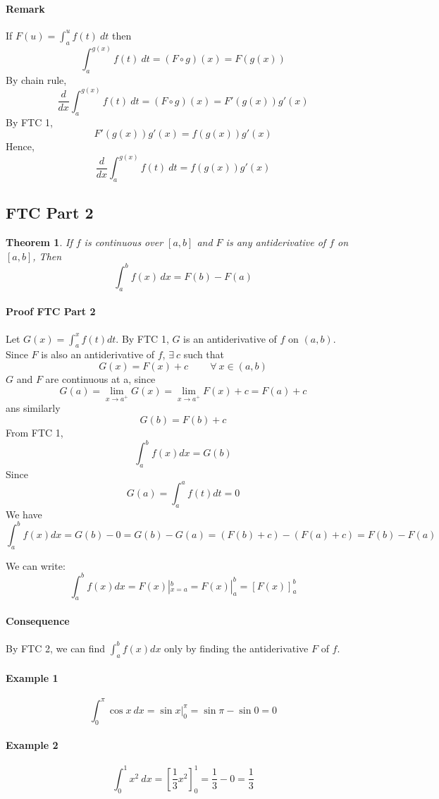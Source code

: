 \documentclass[12pt]{article}
\newtheorem{theorem}{Theorem}
\begin{document}
\paragraph{Remark} If $F(u) = \int_a^u f(t)\:  dt$ then
\[
    \int_a^{g(x)} f(t)\: dt = (F \circ g)(x) = F(g(x))
\]
By chain rule,
\[
    \frac{d}{dx} \int_a^{g(x)} f(t)\: dt = (F \circ g)(x) = F'(g(x))g'(x) 
\]
By FTC 1,
\[
    F'(g(x))g'(x)  = f(g(x))g'(x) 
\]
Hence,
\[
    \frac{d}{dx} \int_a^{g(x)} f(t)\: dt = f(g(x))g'(x) 
\]
\subsection{FTC Part 2}
\begin{theorem} 
    If $f$ is continuous over $[a, b]$ and $F$ is any antiderivative of $f$ on $[a, b]$, Then
    \[
        \int_a^b f(x) \, dx = F(b) - F(a)
    \]
\end{theorem}
\paragraph{Proof FTC Part 2}
Let $G(x) = \int_a^x f(t) dt$. By FTC 1, $G$ is an antiderivative of $f$ on $(a, b)$. Since $F$ is also an antiderivative of $f$, 
$\exists \: c$ such that 
\[
    G(x) = F(x) + c\qquad\: \forall \: x \in (a, b)
\]
$G$ and $F$ are continuous at a, since
\[
    G(a) = \lim_{x \to a^{ +}} G(x) = \lim_{x \to a^{ +}} F(x) + c = F(a) + c
\]
ans similarly
\[
    G(b) = F(b) + c
\]
From FTC 1, 
\[
    \int_a^b f(x) dx = G(b)
\]
Since
\[
    G(a) = \int_a^a f(t) dt = 0
\]
We have
\[
    \int_a^b f(x) dx = G(b) - 0 = G(b) - G(a) = (F(b) + c)- (F(a) + c) = F(b) - F(a)
\]

We can write:
\[
    \int_a^b f(x) dx = F(x) |^{b}_{x = a} = F(x) |^{b}_{a} = [F(x)]^{b}_a
\]

\paragraph{Consequence} By FTC 2, we can find $\int_a^b f(x) dx$ only by finding the antiderivative $F$ of $f$.

\paragraph{Example 1}
\[
    \int_0^{\pi} \cos x\: dx = \sin x |^{\pi}_0 = \sin \pi - \sin 0 = 0
\]

\paragraph{Example 2}
\[
    \int_0^{1} x^2\: dx = [\frac{1}{3}x^2]_0^1 = \frac{1}{3} - 0 = \frac{1}{3}
\]
\end{document}
